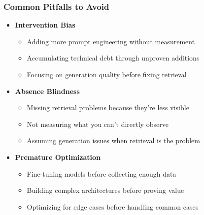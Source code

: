 {    \begin{frame}
        \frametitle{Common Pitfalls to Avoid}
        \begin{itemize}
            \item \textbf{Intervention Bias}
            \begin{itemize}
                \item Adding more prompt engineering without measurement
                \item Accumulating technical debt through unproven additions
                \item Focusing on generation quality before fixing retrieval
            \end{itemize}
            \item \textbf{Absence Blindness}
            \begin{itemize}
                \item Missing retrieval problems because they're less visible
                \item Not measuring what you can't directly observe
                \item Assuming generation issues when retrieval is the problem
            \end{itemize}
            \item \textbf{Premature Optimization}
            \begin{itemize}
                \item Fine-tuning models before collecting enough data
                \item Building complex architectures before proving value
                \item Optimizing for edge cases before handling common cases
            \end{itemize}
        \end{itemize}
    \end{frame}

}
